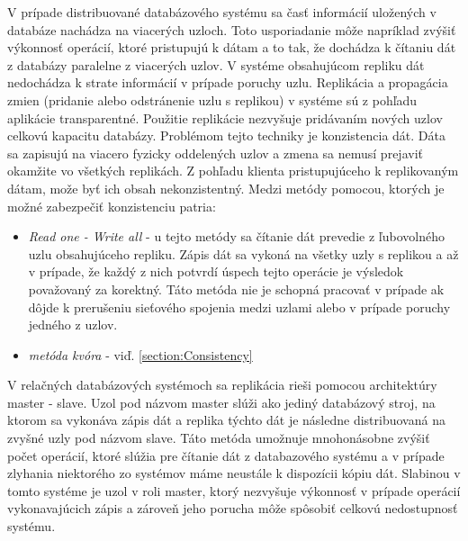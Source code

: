 \documentclass[11pt,twoside,a4paper]{book}
\begin{document}
V prípade distribuované databázového systému sa časť informácií uložených v databáze nachádza na viacerých uzloch. Toto usporiadanie môže napríklad zvýšiť výkonnosť operácií, ktoré pristupujú k dátam a to tak, že dochádza k čítaniu dát z databázy paralelne z viacerých uzlov. V systéme obsahujúcom repliku dát nedochádza k strate informácií v prípade poruchy uzlu. Replikácia a propagácia zmien (pridanie alebo odstránenie uzlu s replikou) v systéme sú z pohľadu aplikácie transparentné. Použitie replikácie nezvyšuje pridávaním nových uzlov celkovú kapacitu databázy. Problémom tejto techniky je konzistencia dát. Dáta sa zapisujú na viacero fyzicky oddelených uzlov a zmena sa nemusí prejaviť okamžite vo všetkých replikách. Z pohľadu klienta pristupujúceho k replikovaným dátam, može byť ich obsah nekonzistentný. Medzi metódy pomocou, ktorých je možné zabezpečiť konzistenciu patria:
\begin{itemize}
  \item
      \emph{Read one - Write all} - u tejto metódy sa čítanie dát prevedie z ľubovolného uzlu obsahujúceho repliku. Zápis dát sa vykoná na všetky uzly s replikou a až v prípade, že každý z nich potvrdí úspech tejto operácie je výsledok považovaný za korektný. Táto metóda nie je schopná pracovať v prípade ak dôjde k prerušeniu sieťového spojenia medzi uzlami alebo v prípade poruchy jedného z uzlov.
  \item
      \emph{metóda kvóra} - viď. \ref{section:Consistency}

\end{itemize}



V relačných databázových systémoch sa replikácia rieši pomocou architektúry master - slave. Uzol pod názvom master slúži ako jediný databázový stroj, na ktorom sa vykonáva zápis dát a replika týchto dát je následne distribuovaná na zvyšné uzly pod názvom slave. Táto metóda umožnuje mnohonásobne zvýšiť počet operácií, ktoré slúžia pre čítanie dát z databazového systému a v prípade zlyhania niektorého zo systémov máme neustále k dispozícii kópiu dát. Slabinou v tomto systéme je uzol v roli master, ktorý nezvyšuje výkonnosť v prípade operácií vykonavajúcich zápis a zároveň jeho porucha môže spôsobiť celkovú nedostupnosť systému.
\end{document}
